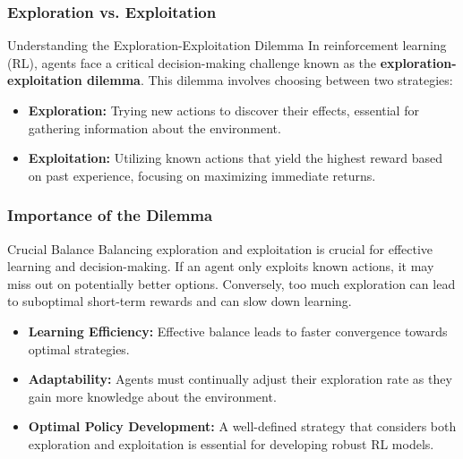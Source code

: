 \documentclass{beamer}
\begin{document}
\begin{frame}[fragile]
    \frametitle{Exploration vs. Exploitation}
    \begin{block}{Understanding the Exploration-Exploitation Dilemma}
        In reinforcement learning (RL), agents face a critical decision-making challenge known as the \textbf{exploration-exploitation dilemma}. This dilemma involves choosing between two strategies:
    \end{block}
    \begin{itemize}
        \item \textbf{Exploration:} Trying new actions to discover their effects, essential for gathering information about the environment.
        \item \textbf{Exploitation:} Utilizing known actions that yield the highest reward based on past experience, focusing on maximizing immediate returns.
    \end{itemize}
\end{frame}

\begin{frame}[fragile]
    \frametitle{Importance of the Dilemma}
    \begin{block}{Crucial Balance}
        Balancing exploration and exploitation is crucial for effective learning and decision-making. If an agent only exploits known actions, it may miss out on potentially better options. Conversely, too much exploration can lead to suboptimal short-term rewards and can slow down learning.
    \end{block}
    \begin{itemize}
        \item \textbf{Learning Efficiency:} Effective balance leads to faster convergence towards optimal strategies.
        \item \textbf{Adaptability:} Agents must continually adjust their exploration rate as they gain more knowledge about the environment.
        \item \textbf{Optimal Policy Development:} A well-defined strategy that considers both exploration and exploitation is essential for developing robust RL models.
    \end{itemize}
\end{frame}
\end{document}
